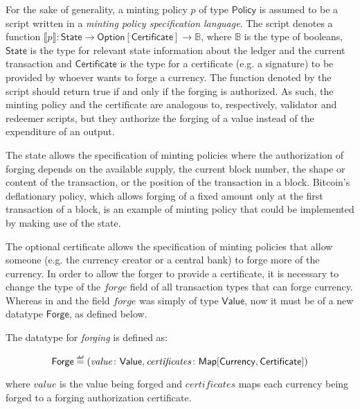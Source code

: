 \documentclass{llncs}
\newcommand{\defeq}{\mathrel{\overset{\makebox[0pt]{\mbox{\normalfont\tiny\sffamily def}}}{=}}}
\newcommand{\type}[1]{\mathsf{#1}}
\newcommand{\mapT}{\type{Map}}
\newcommand{\maybeT}{\type{Option}}
\newcommand{\valueT}{\type{Value}}
\newcommand{\currencyT}{\type{Currency}}
\newcommand{\stateT}{\type{State}}
\newcommand{\policyT}{\type{Policy}}
\newcommand{\certificateT}{\type{Certificate}}
\newcommand{\forgeT}{\type{Forge}}
\newcommand{\field}[1]{\mathit{#1}}
\newcommand{\forge}{\field{forge}}
\newcommand{\val}{\field{value}}
\newcommand{\certificates}{\field{certificates}}
\newcommand{\interpret}[1]{\llbracket #1 \rrbracket}
\newenvironment{smallish}{
	\begin{small}
}{
	\end{small}
}
\begin{document}
For the sake of generality, a minting policy $p$ of type $\policyT$ is assumed to be a script written in a \emph{minting policy specification language}. The script denotes a function $\interpret{p}\colon \stateT \rightarrow \maybeT[\certificateT] \rightarrow \mathbb{B}$, where $\mathbb{B}$ is the type of booleans, $\stateT$ is the type for relevant state information about the ledger and the current transaction and $\certificateT$ is the type for a certificate (e.g. a signature) to be provided by whoever wants to forge a currency. The function denoted by the script should return true if and only if the forging is authorized. As such, the minting policy and the certificate are analogous to, respectively, validator and redeemer scripts, but they authorize the forging of a value instead of the expenditure of an output.

The state allows the specification of minting policies where the authorization of forging depends on the available supply, the current block number, the shape or content of the transaction, or the position of the transaction in a block. Bitcoin's deflationary policy, which allows forging of a fixed amount only at the first transaction of a block, is an example of minting policy that could be implemented by making use of the state.

The optional certificate allows the specification of minting policies that allow someone (e.g. the currency creator or a central bank) to forge more of the currency. In order to allow the forger to provide a certificate, it is necessary to change the type of the $\forge$ field of all transaction types that can forge currency. Whereas in \cite{ChimericLedgers} and \cite{UTxOScripts} the field $\forge$ was simply of type $\valueT$, now it must be of a new datatype $\forgeT$, as defined below.


\begin{definition}
\label{def:Forge}
The datatype for \emph{forging} is defined as:
\begin{smallish}
\begin{equation*}
\forgeT \defeq (\val\colon \valueT, \certificates\colon \mapT[\currencyT, \certificateT])
\end{equation*}
\end{smallish}
where $\val$ is the value being forged and $\certificates$ maps each currency being forged to a forging authorization certificate.
\end{definition}
\end{document}
